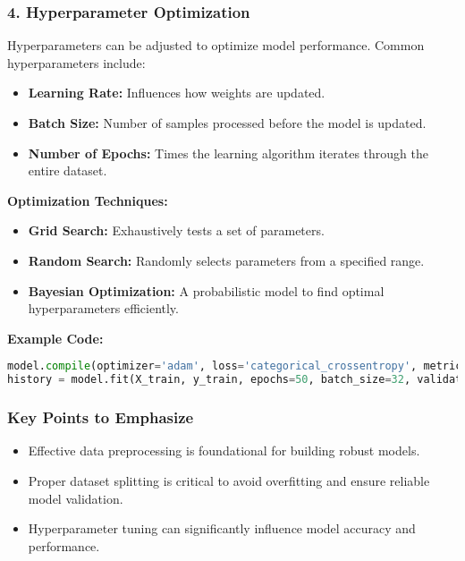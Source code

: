 \documentclass[aspectratio=169]{beamer}
\begin{document}
\begin{frame}[fragile]
    \frametitle{4. Hyperparameter Optimization}
    Hyperparameters can be adjusted to optimize model performance. Common hyperparameters include:
    
    \begin{itemize}
        \item \textbf{Learning Rate:} Influences how weights are updated.
        \item \textbf{Batch Size:} Number of samples processed before the model is updated.
        \item \textbf{Number of Epochs:} Times the learning algorithm iterates through the entire dataset.
    \end{itemize}
    
    \textbf{Optimization Techniques:}
    
    \begin{itemize}
        \item \textbf{Grid Search:} Exhaustively tests a set of parameters.
        \item \textbf{Random Search:} Randomly selects parameters from a specified range.
        \item \textbf{Bayesian Optimization:} A probabilistic model to find optimal hyperparameters efficiently.
    \end{itemize}
    
    \textbf{Example Code:}
    \begin{lstlisting}[language=Python]
model.compile(optimizer='adam', loss='categorical_crossentropy', metrics=['accuracy'])
history = model.fit(X_train, y_train, epochs=50, batch_size=32, validation_data=(X_val, y_val))
    \end{lstlisting}
\end{frame}

\begin{frame}[fragile]
    \frametitle{Key Points to Emphasize}
    \begin{itemize}
        \item Effective data preprocessing is foundational for building robust models.
        \item Proper dataset splitting is critical to avoid overfitting and ensure reliable model validation.
        \item Hyperparameter tuning can significantly influence model accuracy and performance.
    \end{itemize}
\end{frame}
\end{document}
